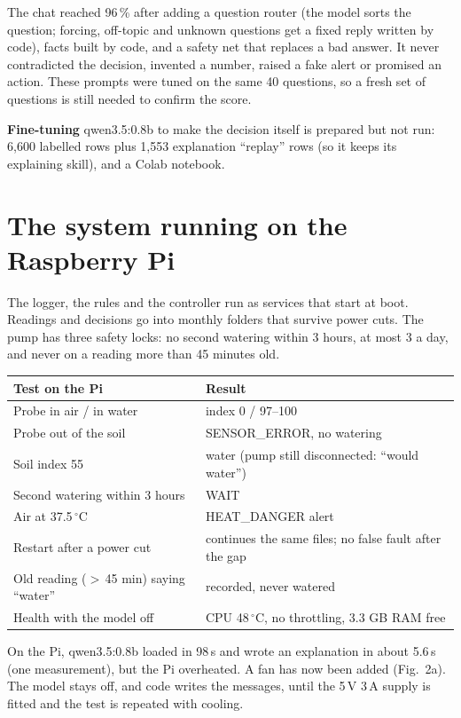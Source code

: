 \documentclass[10pt,a4paper]{article}
\begin{document}
The chat reached 96\,\% after adding a question router (the model sorts the question; forcing,
off-topic and unknown questions get a fixed reply written by code), facts built by code, and a safety
net that replaces a bad answer. It never contradicted the decision, invented a number, raised a fake
alert or promised an action. These prompts were tuned on the same 40 questions, so a fresh set of
questions is still needed to confirm the score.

\textbf{Fine-tuning} qwen3.5:0.8b to make the decision itself is prepared but not run: 6,600 labelled
rows plus 1,553 explanation ``replay'' rows (so it keeps its explaining skill), and a Colab notebook.

\section{The system running on the Raspberry Pi}

The logger, the rules and the controller run as services that start at boot. Readings and decisions
go into monthly folders that survive power cuts. The pump has three safety locks: no second watering
within 3 hours, at most 3 a day, and never on a reading more than 45 minutes old.

\begin{tabularx}{\textwidth}{@{}Xl@{}}
\toprule
\textbf{Test on the Pi} & \textbf{Result} \\
\midrule
Probe in air / in water & index 0 / 97--100 \\
Probe out of the soil & SENSOR\_ERROR, no watering \\
Soil index 55 & water (pump still disconnected: ``would water'') \\
Second watering within 3 hours & WAIT \\
Air at 37.5\,$^\circ$C & HEAT\_DANGER alert \\
Restart after a power cut & continues the same files; no false fault after the gap \\
Old reading ($>$\,45 min) saying ``water'' & recorded, never watered \\
Health with the model off & CPU 48\,$^\circ$C, no throttling, 3.3 GB RAM free \\
\bottomrule
\end{tabularx}

On the Pi, qwen3.5:0.8b loaded in 98\,s and wrote an explanation in about 5.6\,s (one measurement),
but the Pi overheated. A fan has now been added (Fig.~2a). The model stays off, and code writes the
messages, until the 5\,V 3\,A supply is fitted and the test is repeated with cooling.
\end{document}
